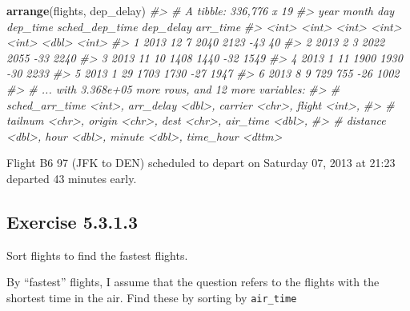 \documentclass[]{book}
\newenvironment{Shaded}{\begin{snugshade}}{\end{snugshade}}
\newcommand{\CommentTok}[1]{\textcolor[rgb]{0.56,0.35,0.01}{\textit{#1}}}
\newcommand{\KeywordTok}[1]{\textcolor[rgb]{0.13,0.29,0.53}{\textbf{#1}}}
\newcommand{\NormalTok}[1]{#1}
\theoremstyle{plain}
\theoremstyle{remark}
\begin{document}
\begin{Shaded}
\begin{Highlighting}[]
\KeywordTok{arrange}\NormalTok{(flights, dep_delay)}
\CommentTok{#> # A tibble: 336,776 x 19}
\CommentTok{#>    year month   day dep_time sched_dep_time dep_delay arr_time}
\CommentTok{#>   <int> <int> <int>    <int>          <int>     <dbl>    <int>}
\CommentTok{#> 1  2013    12     7     2040           2123       -43       40}
\CommentTok{#> 2  2013     2     3     2022           2055       -33     2240}
\CommentTok{#> 3  2013    11    10     1408           1440       -32     1549}
\CommentTok{#> 4  2013     1    11     1900           1930       -30     2233}
\CommentTok{#> 5  2013     1    29     1703           1730       -27     1947}
\CommentTok{#> 6  2013     8     9      729            755       -26     1002}
\CommentTok{#> # ... with 3.368e+05 more rows, and 12 more variables:}
\CommentTok{#> #   sched_arr_time <int>, arr_delay <dbl>, carrier <chr>, flight <int>,}
\CommentTok{#> #   tailnum <chr>, origin <chr>, dest <chr>, air_time <dbl>,}
\CommentTok{#> #   distance <dbl>, hour <dbl>, minute <dbl>, time_hour <dttm>}
\end{Highlighting}
\end{Shaded}

Flight B6 97 (JFK to DEN) scheduled to depart on Saturday 07, 2013 at
21:23 departed 43 minutes early.

\hypertarget{exercise-5.3.1.3}{%
\subsection*{\texorpdfstring{Exercise
{5.3.1.3}}{Exercise 5.3.1.3}}\label{exercise-5.3.1.3}}

Sort flights to find the fastest flights.

By ``fastest'' flights, I assume that the question refers to the flights
with the shortest time in the air. Find these by sorting by
\texttt{air\_time}
\end{document}
